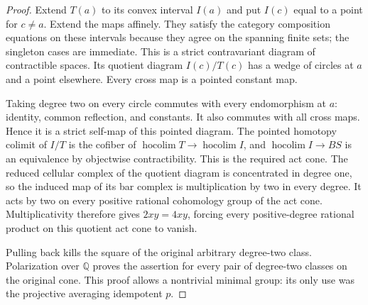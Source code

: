\begin{proof}
Extend $T(a)$ to its convex interval $I(a)$ and put $I(c)$
equal to a point for $c\ne a$.  Extend the maps affinely.
They satisfy the category composition equations on these
intervals because they agree on the spanning finite sets;
the singleton cases are immediate.  This is a strict
contravariant diagram of contractible spaces.  Its quotient
diagram $I(c)/T(c)$ has a wedge of circles at $a$ and a point
elsewhere.  Every cross map is a pointed constant map.

Taking degree two on every circle commutes with every
endomorphism at $a$: identity, common reflection, and
constants.  It also commutes with all cross maps.  Hence it
is a strict self-map of this pointed diagram.  The pointed
homotopy colimit of $I/T$ is the cofiber of
$\operatorname{hocolim}T\to\operatorname{hocolim}I$, and
$\operatorname{hocolim}I\to BS$ is an equivalence by
objectwise contractibility.  This is the required act cone.
The reduced cellular complex of the quotient diagram is
concentrated in degree one, so the induced map of its bar
complex is multiplication by two in every degree.  It acts
by two on every positive rational cohomology group of the
act cone.  Multiplicativity therefore gives
$2xy=4xy$, forcing every positive-degree rational product
on this quotient act cone to vanish.

Pulling back kills the square of the original arbitrary
degree-two class.  Polarization over $\mathbb Q$ proves
the assertion for every pair of degree-two classes on the
original cone.  This proof allows a nontrivial minimal group:
its only use was the projective averaging idempotent $p$.
\end{proof}

